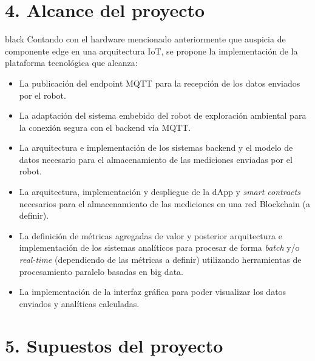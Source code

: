 \documentclass[
11pt, %
]{charter}
\begin{document}
\section{4. Alcance del proyecto}
\label{sec:alcance}

\begin{consigna}{black}
Contando con el hardware mencionado anteriormente que auspicia de componente edge en una arquitectura IoT, se propone la implementación de la plataforma tecnológica que alcanza:

\begin{itemize}
	\item La publicación del endpoint MQTT para la recepción de los datos enviados por el robot.
	\item La adaptación del sistema embebido del robot de exploración ambiental para la conexión segura con el backend vía MQTT.
	\item La arquitectura e implementación de los sistemas backend y el modelo de datos necesario para el almacenamiento de las mediciones enviadas por el robot.
	\item La arquitectura, implementación y despliegue de la dApp y \textit{smart contracts} necesarios para el almacenamiento de las mediciones en una red Blockchain (a definir).
	\item La definición de métricas agregadas de valor y posterior arquitectura e implementación de los sistemas analíticos para procesar de forma \textit{batch} y/o \textit{real-time} (dependiendo de las métricas a definir) utilizando herramientas de procesamiento paralelo basadas en big data.
	\item La implementación de la interfaz gráfica para poder visualizar los datos enviados y analíticas calculadas.

\end{itemize}


\end{consigna}


\section{5. Supuestos del proyecto}
\label{sec:supuestos}
\end{document}

